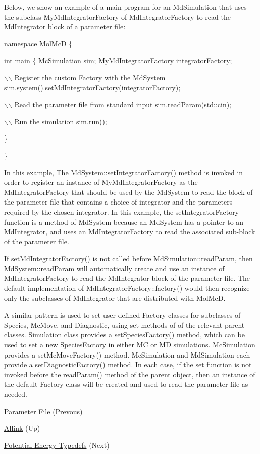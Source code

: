 Below, we show an example of a main program for an Md\+Simulation that uses the subclass My\+Md\+Integrator\+Factory of Md\+Integrator\+Factory to read the Md\+Integrator block of a parameter file\+: 
\begin{DoxyCode}
\textcolor{keyword}{namespace }\hyperlink{namespaceMolMcD}{MolMcD}
\{

   \textcolor{keywordtype}{int} main 
   \{
      McSimulation          sim;
      MyMdIntegratorFactory integratorFactory;
 
      \(\backslash\)\(\backslash\) Register the custom Factory with the MdSystem
      sim.system().setMdIntegratorFactory(integratorFactory);

      \(\backslash\)\(\backslash\) Read the parameter file from standard input
      sim.readParam(std::cin);
  
      \(\backslash\)\(\backslash\) Run the simulation
      sim.run();
  
   \}

\}
\end{DoxyCode}
 In this example, The Md\+System\+::set\+Integrator\+Factory() method is invoked in order to register an instance of My\+Md\+Integrator\+Factory as the Md\+Integrator\+Factory that should be used by the Md\+System to read the block of the parameter file that contains a choice of integrator and the parameters required by the chosen integrator. In this example, the set\+Integrator\+Factory function is a method of Md\+System because an Md\+System has a pointer to an Md\+Integrator, and uses an Md\+Integrator\+Factory to read the associated sub-\/block of the parameter file.

If set\+Md\+Integrator\+Factory() is not called before Md\+Simulation\+::read\+Param, then Md\+System\+::read\+Param will automatically create and use an instance of Md\+Integrator\+Factory to read the Md\+Integrator block of the parameter file. The default implementation of Md\+Integrator\+Factory\+::factory() would then recognize only the subclasses of Md\+Integrator that are distributed with Mol\+McD.

A similar pattern is used to set user defined Factory classes for subclasses of Species, Mc\+Move, and Diagnostic, using set methods of of the relevant parent classes. Simulation class provides a set\+Species\+Factory() method, which can be used to set a new Species\+Factory in either MC or MD simulations. Mc\+Simulation provides a set\+Mc\+Move\+Factory() method. Mc\+Simulation and Md\+Simulation each provide a set\+Diagnostic\+Factory() method. In each case, if the set function is not invoked before the read\+Param() method of the parent object, then an instance of the default Factory class will be created and used to read the parameter file as needed.


\begin{DoxyItemize}
\item \hyperlink{param_page}{Parameter File} (Prevous)  
\item \hyperlink{index}{Allink} (Up)  
\item \hyperlink{typedef_page}{Potential Energy Typedefs} (Next)  
\end{DoxyItemize}